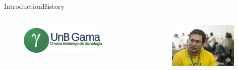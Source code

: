 \documentclass[10pt]{beamer}
\begin{document}
\begin{frame}{Introduction}{History}

  \begin{columns}
  \begin{column}{0.4\textwidth}
    \begin{figure}[fga]
      \includegraphics[width=0.8\textwidth]{images/fga.png}
    \end{figure}
  \end{column}

  \begin{column}{0.4\textwidth}
    \begin{figure}[paulo]
      \includegraphics[width=1.2\textwidth]{images/prmm.jpg}
    \end{figure}
  \end{column}
  \end{columns}

\end{frame}
\end{document}
